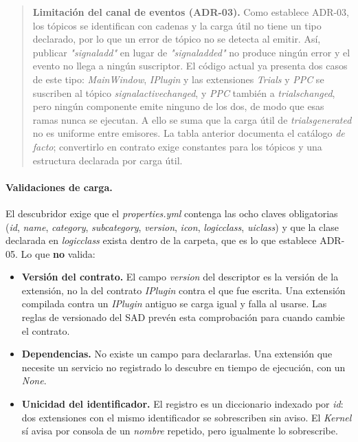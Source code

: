 \documentclass[12pt,letterpaper,oneside]{article}
\DeclareRobustCommand{\_}{\textunderscore\allowbreak}
\begin{document}
\begin{quote}
\textbf{Limitación del canal de eventos (ADR-03).} Como establece ADR-03, los tópicos se identifican con cadenas y la carga útil no tiene un tipo declarado, por lo que un error de tópico no se detecta al emitir. Así, publicar \textit{"signal\_add"} en lugar de \textit{"signal\_added"} no produce ningún error y el evento no llega a ningún suscriptor. El código actual ya presenta dos casos de este tipo: \textit{MainWindow}, \textit{IPlugin} y las extensiones \textit{Trials} y \textit{PPC} se suscriben al tópico \textit{signal\_active\_changed}, y \textit{PPC} también a \textit{trials\_changed}, pero ningún componente emite ninguno de los dos, de modo que esas ramas nunca se ejecutan. A ello se suma que la carga útil de \textit{trials\_generated} no es uniforme entre emisores. La tabla anterior documenta el catálogo \textit{de facto}; convertirlo en contrato exige constantes para los tópicos y una estructura declarada por carga útil.
\end{quote}

\paragraph{Validaciones de carga.} El descubridor exige que el \textit{properties.yml} contenga las ocho claves obligatorias (\textit{id}, \textit{name}, \textit{category}, \textit{subcategory}, \textit{version}, \textit{icon}, \textit{logic\_class}, \textit{ui\_class}) y que la clase declarada en \textit{logic\_class} exista dentro de la carpeta, que es lo que establece ADR-05. Lo que \textbf{no} valida:

\begin{itemize}
    \item \textbf{Versión del contrato.} El campo \textit{version} del descriptor es la versión de la extensión, no la del contrato \textit{IPlugin} contra el que fue escrita. Una extensión compilada contra un \textit{IPlugin} antiguo se carga igual y falla al usarse. Las reglas de versionado del SAD prevén esta comprobación para cuando cambie el contrato.
    \item \textbf{Dependencias.} No existe un campo para declararlas. Una extensión que necesite un servicio no registrado lo descubre en tiempo de ejecución, con un \textit{None}.
    \item \textbf{Unicidad del identificador.} El registro es un diccionario indexado por \textit{id}: dos extensiones con el mismo identificador se sobrescriben sin aviso. El \textit{Kernel} sí avisa por consola de un \textit{nombre} repetido, pero igualmente lo sobrescribe.
\end{itemize}
\end{document}
